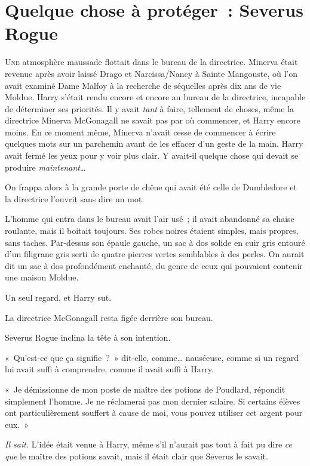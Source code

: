 \chapter{Quelque chose à protéger~: Severus Rogue}

\lettrine{U}{ne} atmosphère maussade flottait dans le bureau de la directrice.
Minerva était revenue après avoir laissé Drago et Narcissa/Nancy à Sainte Mangouste, où l'on avait examiné Dame Malfoy à la recherche de séquelles après dix ans de vie Moldue.
Harry s'était rendu encore et encore au bureau de la directrice, incapable de déterminer ses priorités.
Il y avait \emph{tant} à faire, tellement de choses, même la directrice Minerva McGonagall ne savait pas par où commencer, et Harry encore moins.
En ce moment même, Minerva n'avait cesse de commencer à écrire quelques mots sur un parchemin avant de les effacer d'un geste de la main.
Harry avait fermé les yeux pour y voir plus clair.
Y avait-il quelque chose qui devait se produire \emph{maintenant}…

On frappa alors à la grande porte de chêne qui avait été celle de Dumbledore et la directrice l'ouvrit sans dire un mot.

L'homme qui entra dans le bureau avait l'air usé~; il avait abandonné sa chaise roulante, mais il boitait toujours.
Ses robes noires étaient simples, mais propres, sans taches.
Par-dessus son épaule gauche, un sac à dos solide en cuir gris entouré d'un filigrane gris serti de quatre pierres vertes semblables à des perles.
On aurait dit un sac à dos profondément enchanté, du genre de ceux qui pouvaient contenir une maison Moldue.

Un seul regard, et Harry sut.

La directrice McGonagall resta figée derrière son bureau.

Severus Rogue inclina la tête à son intention.

«~Qu'est-ce que ça signifie~?~»
dit-elle, comme… nauséeuse, comme si un regard lui avait suffi à comprendre, comme il avait suffi à Harry.

«~Je démissionne de mon poste de maître des potions de Poudlard, répondit simplement l'homme.
Je ne réclamerai pas mon dernier salaire.
Si certains élèves ont particulièrement souffert à cause de moi, vous pouvez utiliser cet argent pour eux.~»

\emph{Il sait.} L'idée était venue à Harry, même s'il n'aurait pas tout à fait pu dire \emph{ce que} le maître des potions savait, mais il était clair que Severus le savait.

